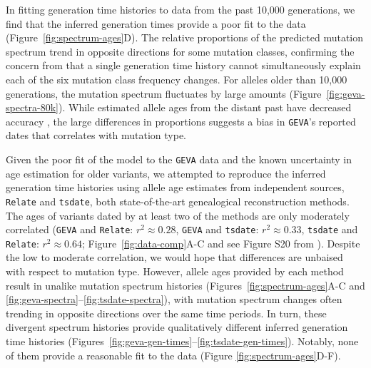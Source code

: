 \documentclass[]{article}
\newcommand{\GEVA}{\texttt{GEVA}\xspace}
\newcommand{\tsdate}{\texttt{tsdate}\xspace}
\newcommand{\relate}{\texttt{Relate}\xspace}
\begin{document}
In fitting generation time histories to data from the past 10,000 generations,
we find that the inferred generation times provide a poor fit to the data
(Figure~\ref{fig:spectrum-ages}D). The relative proportions of the predicted
mutation spectrum trend in opposite directions for some mutation classes,
confirming the concern from \citet{gao2022limited} that a single generation
time history cannot simultaneously explain each of the six mutation class
frequency changes. For alleles older than 10,000 generations, the mutation
spectrum fluctuates by large amounts (Figure~\ref{fig:geva-spectra-80k}). While
estimated allele ages from the distant past have decreased accuracy
\citep{albers2020dating,wang2023human}, the large differences in proportions
suggests a bias in \GEVA's reported dates that correlates with mutation type.

Given the poor fit of the model to the \GEVA data and the known uncertainty in
age estimation for older variants, we attempted to reproduce the inferred
generation time histories using allele age estimates from independent sources,
\relate \citep{speidel2019method} and \tsdate \citep{wohns2022unified}, both
state-of-the-art genealogical reconstruction methods. The ages of variants
dated by at least two of the methods are only moderately correlated (\GEVA and
    \relate: $r^2 \approx 0.28$, \GEVA and \tsdate: $r^2 \approx 0.33$, \tsdate
and \relate: $r^2 \approx 0.64$; Figure~\ref{fig:data-comp}A-C and see Figure
S20 from \citet{wohns2022unified}). Despite the low to moderate correlation, we
would hope that differences are unbaised with respect to mutation type.
However, allele ages provided by each method result in unalike mutation
spectrum histories (Figures~\ref{fig:spectrum-ages}A-C and
\ref{fig:geva-spectra}--\ref{fig:tsdate-spectra}), with mutation spectrum
changes often trending in opposite directions over the same time periods. In
turn, these divergent spectrum histories provide qualitatively different
inferred generation time histories
(Figures~\ref{fig:geva-gen-times}--\ref{fig:tsdate-gen-times}). Notably, none
of them provide a reasonable fit to the data (Figure
\ref{fig:spectrum-ages}D-F).
\end{document}
